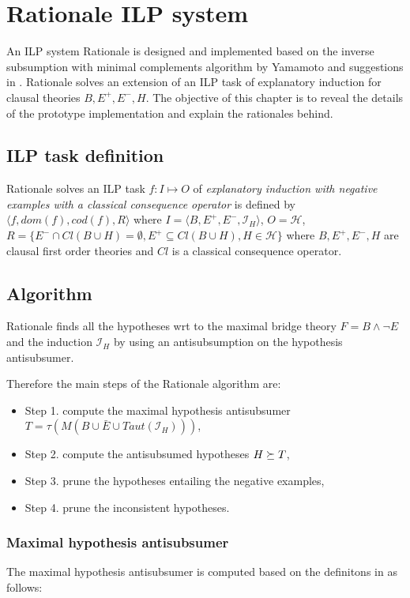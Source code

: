 \chapter{Rationale ILP system}\label{chap:rationale_ilp_system}
An ILP system Rationale is designed and implemented based on the inverse subsumption with minimal complements algorithm  by Yamamoto\cite{yamamoto2012inverse} and suggestions in . Rationale solves an extension of an ILP task of explanatory induction for clausal theories $B, E^+, E^-, H$. The objective of this chapter is to reveal the details of the prototype implementation and explain the rationales behind.

\section{ILP task definition}
Rationale solves an ILP task $f:I \mapsto O$ of \emph{explanatory induction with negative examples with a classical consequence operator} is defined by $\langle f, dom(f), cod(f), R \rangle$ where $I=\langle B, E^+, E^-, \mathcal{I}_H \rangle$,
$O=\mathcal{H}$,
$R=\{E^- \cap Cl(B \cup H) = \emptyset, E^+ \subseteq Cl(B \cup H), H \in \mathcal{H}\}$ where $B, E^+, E^-, H$ are clausal first order theories and $Cl$ is a classical consequence operator.

\section{Algorithm}
Rationale finds all the hypotheses wrt to the maximal bridge theory $F=B \land \neg E$ and the induction $\mathcal{I}_H$ by using an antisubsumption on the hypothesis antisubsumer.

Therefore the main steps of the Rationale algorithm are:
\begin{itemize}
\item Step 1. compute the maximal hypothesis antisubsumer
$T=\tau(M(B \cup \bar{E} \cup Taut(\mathcal{I}_H)))$,
\item Step 2. compute the antisubsumed hypotheses $H \succeq T$,
\item Step 3. prune the hypotheses entailing the negative examples,
\item Step 4. prune the inconsistent hypotheses.
\end{itemize}

\subsection{Maximal hypothesis antisubsumer}
The maximal hypothesis antisubsumer is computed based on the definitons in  as follows:

